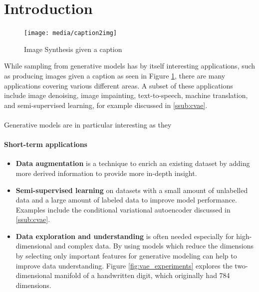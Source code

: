 \section{Introduction}
\label{sec:introduction}

\begin{figure}[h]
  \texttt{[image: media/caption2img]}
  \caption[Caption-to-Image Samples]{Image Synthesis given a caption \cite{gan_t2i:2016}}
  \label{fig:caption2img}
\end{figure}
While sampling from generative models has by itself interesting applications, such as producing images given a caption as seen in Figure \ref{fig:caption2img}, there are many applications covering various different areas.
A subset of these applications include
image denoising, %
image impainting, %
text-to-speech, %
machine translation, %
and semi-supervised learning, for example discussed in \ref{ssub:cvae}.
\\\\



Generative models are in particular interesting as they 



\paragraph{Short-term applications}
\begin{itemize}
  \item \textbf{Data augmentation} is a technique to enrich an existing dataset by adding more derived information to provide more in-depth insight.
  \item \textbf{Semi-supervised learning} on datasets with a small amount of unlabelled data and a large amount of labeled data to improve model performance. Examples include the conditional variational autoencoder discussed in \ref{ssub:cvae}.
  \item \textbf{Data exploration and understanding} is often needed especially for high-dimensional and complex data. By using models which reduce the dimensions by selecting only important features for generative modeling can help to improve data understanding. Figure \ref{fig:vae_experiments} explores the two-dimensional manifold of a handwritten digit, which originally had 784 dimensions.
\end{itemize}

